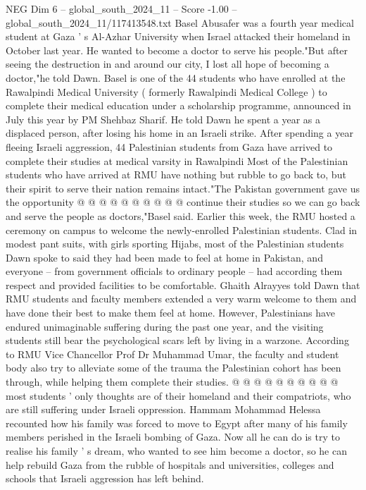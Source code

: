 \begin{textsample}{NEG Dim 6 – global\_south\_2024\_11 – Score -1.00 – global\_south\_2024\_11/117413548.txt}  \label{ex:f6_neg_068}
Basel Abusafer was a fourth year medical student at Gaza ' s Al-Azhar University when Israel attacked their homeland in October last year.
He wanted to become a doctor to serve his people."But after seeing the destruction in and around our city, I lost all hope of becoming a doctor,"he told Dawn.
Basel is one of the 44 students who have enrolled at the Rawalpindi Medical University ( formerly Rawalpindi Medical College ) to complete their medical education under a scholarship programme, announced in July this year by PM Shehbaz Sharif.
He told Dawn he spent a year as a displaced person, after losing his home in an Israeli strike.
After spending a year fleeing Israeli aggression, 44 Palestinian students from Gaza have arrived to complete their studies at medical varsity in Rawalpindi Most of the Palestinian students who have arrived at RMU have nothing but rubble to go back to, but their spirit to serve their nation remains intact."The Pakistan government gave us the opportunity @ @ @ @ @ @ @ @ @ @ continue their studies so we can go back and serve the people as doctors,"Basel said.
Earlier this week, the RMU hosted a ceremony on campus to welcome the newly-enrolled Palestinian students.
Clad in modest pant suits, with girls sporting Hijabs, most of the Palestinian students Dawn spoke to said they had been made to feel at home in Pakistan, and everyone -- from government officials to ordinary people -- had according them respect and provided facilities to be comfortable.
Ghaith Alrayyes told Dawn that RMU students and faculty members extended a very warm welcome to them and have done their best to make them feel at home.
However, Palestinians have endured unimaginable suffering during the past one year, and the visiting students still bear the psychological scars left by living in a warzone.
According to RMU Vice Chancellor Prof Dr Muhammad Umar, the faculty and student body also try to alleviate some of the trauma the Palestinian cohort has been through, while helping them complete their studies. @ @ @ @ @ @ @ @ @ @ most students ' only thoughts are of their homeland and their compatriots, who are still suffering under Israeli oppression.
Hammam Mohammad Helessa recounted how his family was forced to move to Egypt after many of his family members perished in the Israeli bombing of Gaza.
Now all he can do is try to realise his family ' s dream, who wanted to see him become a doctor, so he can help rebuild Gaza from the rubble of hospitals and universities, colleges and schools that Israeli aggression has left behind.

\end{textsample}
